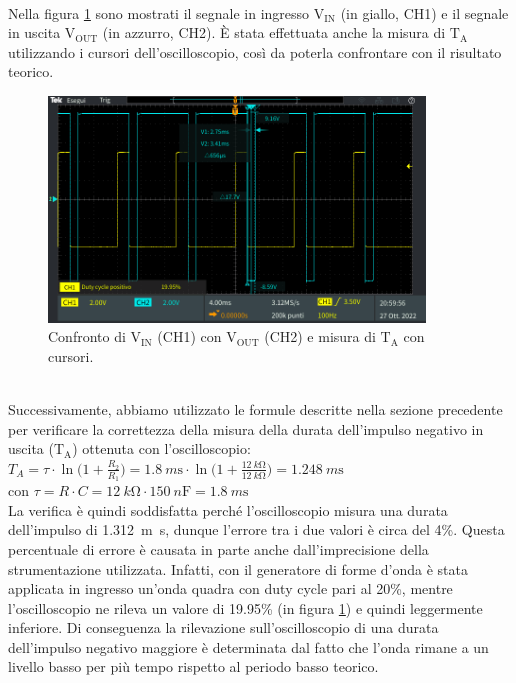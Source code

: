 \documentclass{report}
\begin{document}
\\Nella figura \ref{figura:TEK00002} sono mostrati il segnale in ingresso $\mathrm{V_{IN}}$ (in giallo, CH1) e il segnale in uscita $\mathrm{V_{OUT}}$ (in azzurro, CH2). \`E stata effettuata anche la misura di $\mathrm{T_A}$ utilizzando i cursori dell'oscilloscopio, così da poterla confrontare con il risultato teorico.
\begin{figure}[h!]
	\centering
	\includegraphics[height=6cm]{immagini/TEK00002}
	\caption{Confronto di $\mathrm{V_{IN}}$ (CH1) con $\mathrm{V_{OUT}}$ (CH2) e misura di $\mathrm{T_A}$ con cursori.}
	\label{figura:TEK00002}
\end{figure}
\\Successivamente, abbiamo utilizzato le formule descritte nella sezione precedente per verificare la correttezza della misura della durata dell'impulso negativo in uscita ($\mathrm{T_A}$) ottenuta con l'oscilloscopio:
\\[4pt]\indent$\displaystyle{T_A=\tau\cdot\ln\biggl(1+\frac{R_2}{R_1}\biggr)=\SI{1.8}{m\second}\cdot\ln\biggl(1+\frac{\SI{12}{k\ohm}}{\SI{12}{k\ohm}}\biggr)=\SI{1.248}{m\second}}$
\\[4pt]\indent con $\displaystyle{\tau=R \cdot C=\SI{12}{k\ohm}\cdot\SI{150}{n\farad}=\SI{1.8}{m\second}}$
\\[4pt]La verifica è quindi soddisfatta perché l'oscilloscopio misura una durata dell'impulso di \SI{1.312}{m\second}, dunque l'errore tra i due valori è circa del 4\%. Questa percentuale di errore è causata in parte anche dall'imprecisione  della strumentazione utilizzata. Infatti, con il generatore di forme d'onda è stata applicata in ingresso un'onda quadra con duty cycle pari al 20\%, mentre l'oscilloscopio ne rileva un valore di 19.95\% (in figura \ref{figura:TEK00002}) e quindi leggermente inferiore. Di conseguenza la rilevazione sull'oscilloscopio di una durata dell'impulso negativo maggiore è determinata dal fatto che l'onda rimane a un livello basso per più tempo rispetto al periodo basso teorico.\par
\end{document}
